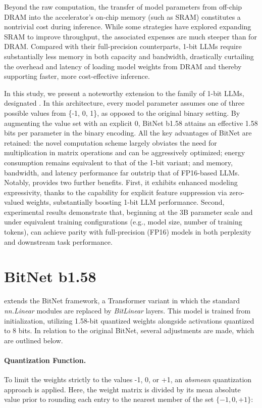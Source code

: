 Beyond the raw computation, the transfer of model parameters from off-chip DRAM into the accelerator's on-chip memory (such as SRAM) constitutes a nontrivial cost during inference. While some strategies have explored expanding SRAM to improve throughput, the associated expenses are much steeper than for DRAM. Compared with their full-precision counterparts, 1-bit LLMs require substantially less memory in both capacity and bandwidth, drastically curtailing the overhead and latency of loading model weights from DRAM and thereby supporting faster, more cost-effective inference.

In this study, we present a noteworthy extension to the family of 1-bit LLMs, designated \textbf{}. In this architecture, every model parameter assumes one of three possible values from \{-1, 0, 1\}, as opposed to the original binary setting. By augmenting the value set with an explicit 0, BitNet b1.58 attains an effective 1.58 bits per parameter in the binary encoding. All the key advantages of BitNet are retained: the novel computation scheme largely obviates the need for multiplication in matrix operations and can be aggressively optimized; energy consumption remains equivalent to that of the 1-bit variant; and memory, bandwidth, and latency performance far outstrip that of FP16-based LLMs. Notably,  provides two further benefits. First, it exhibits enhanced modeling expressivity, thanks to the capability for explicit feature suppression via zero-valued weights, substantially boosting 1-bit LLM performance. Second, experimental results demonstrate that, beginning at the 3B parameter scale and under equivalent training configurations (e.g., model size, number of training tokens),  can achieve parity with full-precision (FP16) models in both perplexity and downstream task performance.

\section{BitNet b1.58}

 extends the BitNet framework, a Transformer variant in which the standard \emph{nn.Linear} modules are replaced by \emph{BitLinear} layers. This model is trained from initialization, utilizing 1.58-bit quantized weights alongside activations quantized to 8 bits. In relation to the original BitNet, several adjustments are made, which are outlined below.

\paragraph{Quantization Function.} To limit the weights strictly to the values -1, 0, or +1, an \emph{absmean} quantization approach is applied. Here, the weight matrix is divided by its mean absolute value prior to rounding each entry to the nearest member of the set $\{-1, 0, +1\}$:


